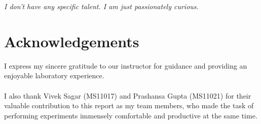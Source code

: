 
\begin{flushright}{\slshape    
I don't have any specific talent. I am just passionately curious.}
\end{flushright}



\bigskip

\begingroup
\let\clearpage\relax
\let\cleardoublepage\relax
\let\cleardoublepage\relax
\chapter*{Acknowledgements}
I express my sincere gratitude to our instructor \myProf for guidance and providing an enjoyable laboratory experience.\\
 \\
I also thank Vivek Sagar (MS11017) and Prashansa Gupta (MS11021) for their valuable contribution to this report as my team members, who made the task of performing experiments immensely comfortable and productive at the same time.\\
\bigskip


\endgroup



